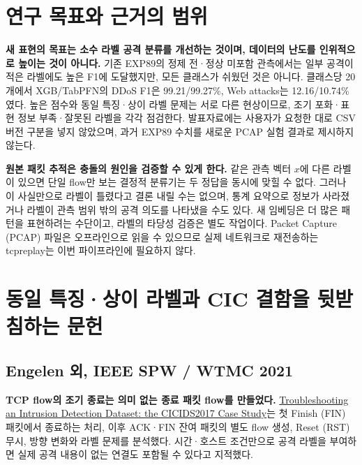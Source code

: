 
\usepackage{tabularx}


\section{연구 목표와 근거의 범위}
\textbf{새 표현의 목표는 소수 라벨 공격 분류를 개선하는 것이며, 데이터의 난도를 인위적으로 높이는 것이 아니다.} 기존 EXP89의 정제 전·정상 미포함 관측에서는 일부 공격이 적은 라벨에도 높은 F1에 도달했지만, 모든 클래스가 쉬웠던 것은 아니다. 클래스당 20개에서 XGB/TabPFN의 DDoS F1은 99.21/99.27\%, Web attacks는 12.16/10.74\%였다. 높은 점수와 동일 특징·상이 라벨 문제는 서로 다른 현상이므로, 조기 포화·표현 정보 부족·잘못된 라벨을 각각 점검한다. 발표자료에는 사용자가 요청한 대로 CSV 버전 구분을 넣지 않았으며, 과거 EXP89 수치를 새로운 PCAP 실험 결과로 제시하지 않는다.

\textbf{원본 패킷 추적은 충돌의 원인을 검증할 수 있게 한다.} 같은 관측 벡터 $x$에 다른 라벨이 있으면 단일 flow만 보는 결정적 분류기는 두 정답을 동시에 맞힐 수 없다. 그러나 이 사실만으로 라벨이 틀렸다고 결론 내릴 수는 없으며, 통계 요약으로 정보가 사라졌거나 라벨이 관측 범위 밖의 공격 의도를 나타냈을 수도 있다. 새 임베딩은 더 많은 패턴을 표현하려는 수단이고, 라벨의 타당성 검증은 별도 작업이다. Packet Capture (PCAP) 파일은 오프라인으로 읽을 수 있으므로 실제 네트워크로 재전송하는 tcpreplay는 이번 파이프라인에 필요하지 않다.

\section{동일 특징·상이 라벨과 CIC 결함을 뒷받침하는 문헌}
\subsection{Engelen 외, IEEE SPW / WTMC 2021}
\textbf{TCP flow의 조기 종료는 의미 없는 종료 패킷 flow를 만들었다.} \href{https://intrusion-detection.distrinet-research.be/WTMC2021/Resources/wtmc2021_Engelen_Troubleshooting.pdf}{Troubleshooting an Intrusion Detection Dataset: the CICIDS2017 Case Study}는 첫 Finish (FIN) 패킷에서 종료하는 처리, 이후 ACK·FIN 잔여 패킷의 별도 flow 생성, Reset (RST) 무시, 방향 변화와 라벨 문제를 분석했다. 시간·호스트 조건만으로 공격 라벨을 부여하면 실제 공격 내용이 없는 연결도 포함될 수 있다고 지적했다.
